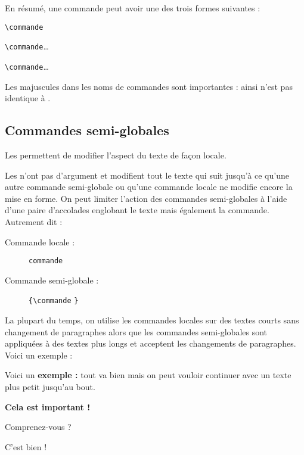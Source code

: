 En résumé, une commande peut avoir une des trois formes suivantes :

	\verb!\commande! \par
	\verb!\commande!\dots\par
	\verb!\commande!\dots


\begin{info}
    Les majuscules dans les noms de commandes sont importantes : ainsi  n'est pas identique à .
\end{info}

\subsection{Commandes semi-globales}

Les  permettent de modifier l'aspect du texte de façon locale.\par
Les  n'ont pas d'argument et modifient tout le texte qui suit jusqu'à ce qu'une autre commande semi-globale ou qu'une commande locale ne modifie encore la mise en forme. On peut limiter l'action des commandes semi-globales à l'aide d'une paire d'accolades englobant le texte mais également la commande. Autrement dit :

\begin{description}
    \item[Commande locale :] \verb!commande!

    \item[Commande semi-globale :] \verb!{\commande! \verb!}!
\end{description}

La plupart du temps, on utilise les commandes locales sur des textes courts sans changement de paragraphes alors que les commandes semi-globales sont appliquées à des textes plus longs et acceptent les changements de paragraphes. Voici un exemple :\bigskip

\begin{SideBySideExample}
    Voici un \textbf{exemple :}
    tout va bien mais on peut vouloir
    continuer avec un texte
    \tiny plus petit jusqu'au bout.\par
    {\bfseries
        Cela est important !\par
        Comprenez-vous ?
    }
    C'est bien !
\end{SideBySideExample}


